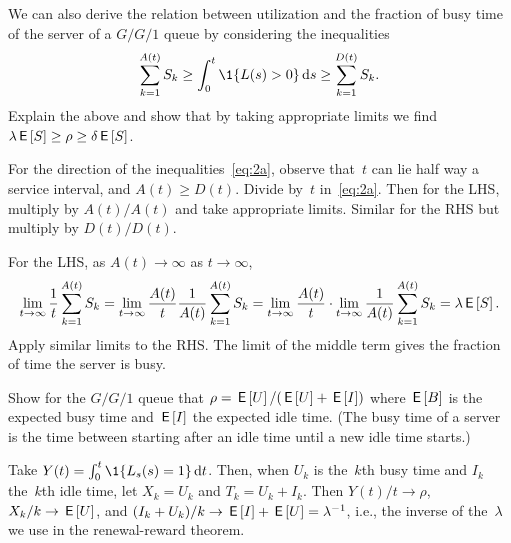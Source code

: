 \documentclass[stochastic-or.tex]{subfiles}
\begin{document}
\begin{exercise}\label{ex:70}
We can also derive the relation between utilization and the fraction of busy time of the server of a $G/G/1$ queue by considering the inequalities
\begin{equation}\label{eq:2a}
 \sum_{k=1}^{A(t)} S_k \geq \int_0^t \1{\L(s)>0} \d s \geq \sum_{k=1}^{D(t)} S_k.
\end{equation}
Explain the above and show that by taking appropriate limits we find $\lambda \,\mathsf{E}\left[S\right] \geq \rho \geq \delta \,\mathsf{E}\left[S\right]$.
\begin{hint}
For the direction of the inequalities~\cref{eq:2a}, observe that~$t$ can lie half way a service interval, and $A(t) \geq D(t)$.
Divide by~$t$ in~\cref{eq:2a}. Then for the LHS, multiply by $A(t)/A(t)$ and take appropriate limits. Similar for the RHS but multiply by $D(t)/D(t)$.
\end{hint}
\begin{solution}
  For the LHS, as $A(t)\to \infty$ as $t\to\infty$,
\begin{equation*}
 \lim_{t\to\infty} \frac 1 t\sum_{k=1}^{A(t)} S_k =
 \lim_{t\to\infty} \frac{A(t)}t \frac{1}{A(t)} \sum_{k=1}^{A(t)} S_k =
 \lim_{t\to\infty} \frac{A(t)}t \cdot \lim_{t\to\infty}\frac{1}{A(t)} \sum_{k=1}^{A(t)} S_k = \lambda \,\mathsf{E}\left[S\right].
\end{equation*}
Apply similar limits to the RHS.
The limit of the middle term gives the fraction of time the server is busy.
\end{solution}
\end{exercise}

\begin{exercise}\label{ex:57}
Show for the $G/G/1$ queue that $\rho = \,\mathsf{E}\left[U\right] / (\,\mathsf{E}\left[U\right] + \,\mathsf{E}\left[I\right])$ where $\,\mathsf{E}\left[B\right]$ is the expected busy time and $\,\mathsf{E}\left[I\right]$ the expected idle time.
(The busy time of a server is the time between starting after an idle time until a new idle time starts.)
\begin{solution}
Take $Y(t) = \int_0^t \1{\Ls(s)=1} \d t$. Then, when $U_{k}$ is the~$k$th busy time and $I_{k}$ the~$k$th idle time, let $X_{k} = U_{k}$ and $T_{k} = U_k + I_{k}$.
Then $Y(t)/ t\to\rho$, $X_k/k \to \,\mathsf{E}\left[U\right]$, and $(I_k + U_k)/k \to \,\mathsf{E}\left[I\right] + \,\mathsf{E}\left[U\right] = \lambda^{-1}$, i.e., the inverse of the~$\lambda$ we use in the renewal-reward theorem.
\end{solution}
\end{exercise}



\end{document}
